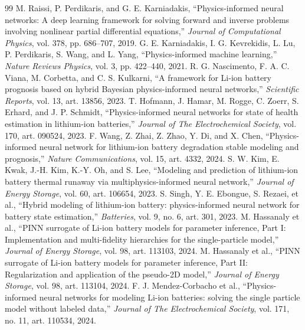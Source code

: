 \documentclass[14pt,a4paper,oneside]{extreport}
\begin{document}
\begingroup
{}
\begin{thebibliography}{99}
 M. Raissi, P. Perdikaris, and G. E. Karniadakis, ``Physics-informed neural networks: A deep learning framework for solving forward and inverse problems involving nonlinear partial differential equations,'' \emph{Journal of Computational Physics}, vol. 378, pp. 686--707, 2019.
 G. E. Karniadakis, I. G. Kevrekidis, L. Lu, P. Perdikaris, S. Wang, and L. Yang, ``Physics-informed machine learning,'' \emph{Nature Reviews Physics}, vol. 3, pp. 422--440, 2021.
 R. G. Nascimento, F. A. C. Viana, M. Corbetta, and C. S. Kulkarni, ``A framework for Li-ion battery prognosis based on hybrid Bayesian physics-informed neural networks,'' \emph{Scientific Reports}, vol. 13, art. 13856, 2023.
 T. Hofmann, J. Hamar, M. Rogge, C. Zoerr, S. Erhard, and J. P. Schmidt, ``Physics-informed neural networks for state of health estimation in lithium-ion batteries,'' \emph{Journal of The Electrochemical Society}, vol. 170, art. 090524, 2023.
 F. Wang, Z. Zhai, Z. Zhao, Y. Di, and X. Chen, ``Physics-informed neural network for lithium-ion battery degradation stable modeling and prognosis,'' \emph{Nature Communications}, vol. 15, art. 4332, 2024.
 S. W. Kim, E. Kwak, J.-H. Kim, K.-Y. Oh, and S. Lee, ``Modeling and prediction of lithium-ion battery thermal runaway via multiphysics-informed neural network,'' \emph{Journal of Energy Storage}, vol. 60, art. 106654, 2023.
 S. Singh, Y. E. Ebongue, S. Rezaei, et al., ``Hybrid modeling of lithium-ion battery: physics-informed neural network for battery state estimation,'' \emph{Batteries}, vol. 9, no. 6, art. 301, 2023.
 M. Hassanaly et al., ``PINN surrogate of Li-ion battery models for parameter inference, Part I: Implementation and multi-fidelity hierarchies for the single-particle model,'' \emph{Journal of Energy Storage}, vol. 98, art. 113103, 2024.
 M. Hassanaly et al., ``PINN surrogate of Li-ion battery models for parameter inference, Part II: Regularization and application of the pseudo-2D model,'' \emph{Journal of Energy Storage}, vol. 98, art. 113104, 2024.
 F. J. Mendez-Corbacho et al., ``Physics-informed neural networks for modeling Li-ion batteries: solving the single particle model without labeled data,'' \emph{Journal of The Electrochemical Society}, vol. 171, no. 11, art. 110534, 2024.

\end{thebibliography}
\end{document}
